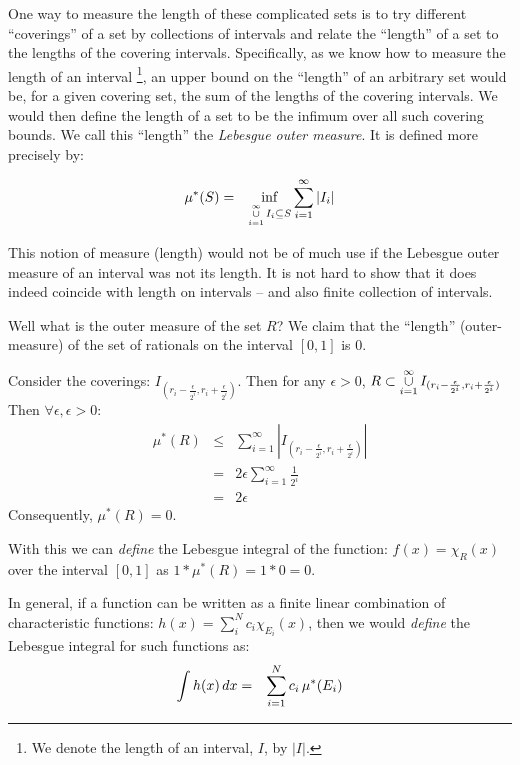 \documentclass{article}
\begin{document}
One way to measure the length of these complicated sets is to try different ``coverings'' 
of a set by collections of intervals and relate the ``length'' of a set to the lengths of
the covering intervals. Specifically, as
we know how to measure the length of an interval%
\footnote{We denote the length of an interval, $I$, by $|I|$.}, an upper bound on 
the ``length'' of an arbitrary set would be, for a given covering set, 
the sum of the lengths of the covering intervals.
We would then define the length of a set to be the infimum over all such covering bounds.
We call this ``length'' the {\em Lebesgue outer measure\/}. It is defined more precisely by:

\begin{eqnarray}
	\mu^*(S) & = & \inf_{\mathop{\cup}_{i=1}^\infty\limits I_i \subseteq S} \sum_{i=1}^\infty |I_i| 
\end{eqnarray}

This notion of measure (length) would not be of much use if the Lebesgue outer measure of
an interval was not its length.
It is not hard to show that it does indeed coincide with length on 
intervals -- and also finite collection of intervals.

Well what is the outer measure of the set $R$? We claim that the ``length'' 
(outer-measure) of the set of rationals on the interval $[0,1]$ is $0$.

Consider the coverings: $I_{(r_i - \frac{\epsilon}{2^i}, r_i + \frac{\epsilon}{2^i})}$. 
Then for any
$\epsilon > 0$, $R \subset \mathop{\cup}_{i=1}^\infty\limits I_{(r_i - \frac{\epsilon}{2^i}, r_i + \frac{\epsilon}{2^i})}$
Then $\forall \epsilon, \epsilon > 0$:
\begin{eqnarray}
\mu^*(R) & \le & \sum_{i=1}^\infty  |I_{(r_i - \frac{\epsilon}{2^i}, r_i + \frac{\epsilon}{2^i})}| \\
		 & = & 2 \epsilon \sum_{i=1}^\infty \frac{1}{2^i} \\
		 & = & 2 \epsilon
\end{eqnarray}
Consequently, $\mu^*(R) = 0$. 

With this we can {\em define\/} the Lebesgue integral of the function: 
$f(x) = \chi_{R}(x)$ over the interval $[0,1]$ 
as $1 * \mu^*(R) = 1 * 0 = 0$.

In general, if a function can be written as a finite linear combination of 
characteristic functions: $h(x) = \sum_i^N c_i \chi_{E_i}(x)$,
then we would {\em define\/} the Lebesgue integral for such functions as:
\begin{eqnarray}
	\int h(x) \, dx & = & \sum_{i=1}^N\limits c_i \, \mu^*(E_i)
\end{eqnarray}
\end{document}
